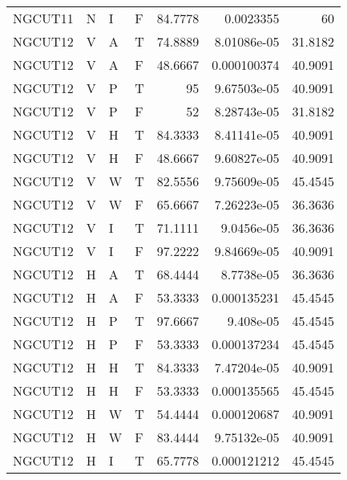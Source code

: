 \begin{longtable}{llllrrr}
    NGCUT11  & N         & I         & F          & 84.7778    & 0.0023355   & 60       \\
    NGCUT12  & V         & A         & T          & 74.8889    & 8.01086e-05 & 31.8182  \\
    NGCUT12  & V         & A         & F          & 48.6667    & 0.000100374 & 40.9091  \\
    NGCUT12  & V         & P         & T          & 95         & 9.67503e-05 & 40.9091  \\
    NGCUT12  & V         & P         & F          & 52         & 8.28743e-05 & 31.8182  \\
    NGCUT12  & V         & H         & T          & 84.3333    & 8.41141e-05 & 40.9091  \\
    NGCUT12  & V         & H         & F          & 48.6667    & 9.60827e-05 & 40.9091  \\
    NGCUT12  & V         & W         & T          & 82.5556    & 9.75609e-05 & 45.4545  \\
    NGCUT12  & V         & W         & F          & 65.6667    & 7.26223e-05 & 36.3636  \\
    NGCUT12  & V         & I         & T          & 71.1111    & 9.0456e-05  & 36.3636  \\
    NGCUT12  & V         & I         & F          & 97.2222    & 9.84669e-05 & 40.9091  \\
    NGCUT12  & H         & A         & T          & 68.4444    & 8.7738e-05  & 36.3636  \\
    NGCUT12  & H         & A         & F          & 53.3333    & 0.000135231 & 45.4545  \\
    NGCUT12  & H         & P         & T          & 97.6667    & 9.408e-05   & 45.4545  \\
    NGCUT12  & H         & P         & F          & 53.3333    & 0.000137234 & 45.4545  \\
    NGCUT12  & H         & H         & T          & 84.3333    & 7.47204e-05 & 40.9091  \\
    NGCUT12  & H         & H         & F          & 53.3333    & 0.000135565 & 45.4545  \\
    NGCUT12  & H         & W         & T          & 54.4444    & 0.000120687 & 40.9091  \\
    NGCUT12  & H         & W         & F          & 83.4444    & 9.75132e-05 & 40.9091  \\
    NGCUT12  & H         & I         & T          & 65.7778    & 0.000121212 & 45.4545  \\

\end{longtable}
